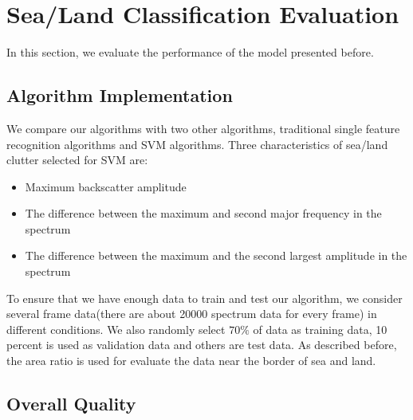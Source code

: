 


\section{Sea/Land Classification Evaluation}

In this section, we evaluate the performance of the model presented before.
\subsection{Algorithm Implementation}
We compare our algorithms with two other algorithms, traditional single feature recognition algorithms and SVM algorithms. Three characteristics of sea/land clutter selected for SVM are:
\begin{itemize}
	\item Maximum backscatter amplitude
	\item The difference between the maximum and second major frequency in the spectrum
	\item The difference between the maximum and the second largest amplitude in the spectrum
\end{itemize}
To ensure that we have enough data to train and test our algorithm, we consider several frame data(there are about 20000 spectrum data for every frame) in different conditions. We also randomly select $70\%$ of data as training data, 10 percent is used as validation data and others are test data. As described before, the area ratio is used for evaluate the data near the border of sea and land.


\subsection{Overall Quality}

